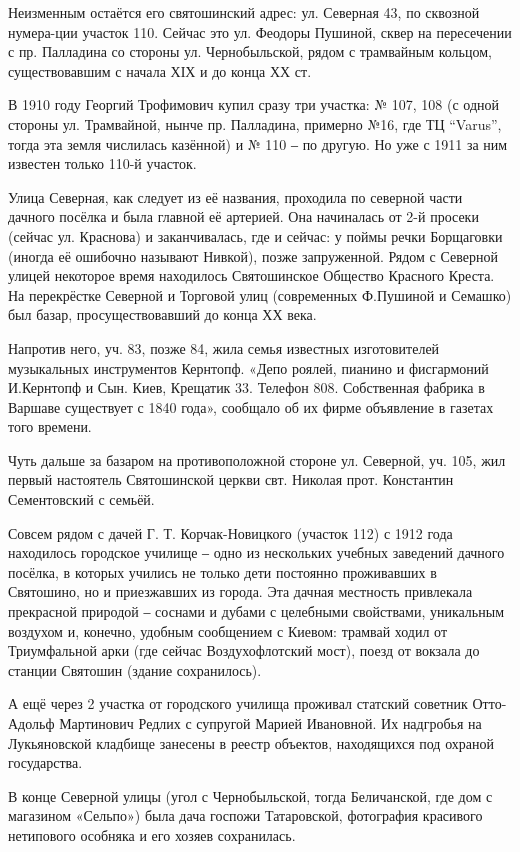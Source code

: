 Неизменным остаётся его святошинский адрес: ул. Северная  43, по сквозной
нумера-ции участок 110. Сейчас это ул. Феодоры Пушиной, сквер на пересечении с
пр. Палладина со стороны ул. Чернобыльской, рядом с трамвайным кольцом,
существовавшим с начала ХІХ и до конца ХХ ст.

В 1910 году Георгий Трофимович купил сразу три участка: № 107, 108 (с одной
стороны ул. Трамвайной, нынче пр. Палладина, примерно №16, где ТЦ “Varus”,
тогда эта земля числилась казённой) и № 110 ‒ по другую. Но уже с 1911 за ним
известен только 110-й участок.

Улица Северная, как следует из её названия, проходила по северной части дачного
посёлка и была главной её артерией. Она начиналась от 2-й просеки (сейчас ул.
Краснова) и заканчивалась, где и сейчас: у поймы речки Борщаговки (иногда её
ошибочно называют Нивкой), позже запруженной. Рядом с Северной улицей некоторое
время находилось Святошинское Общество Красного Креста. На перекрёстке Северной
и Торговой улиц (современных Ф.Пушиной и Семашко) был базар, просуществовавший
до конца ХХ века. 

Напротив него, уч. 83, позже 84, жила семья известных изготовителей музыкальных
инструментов Кернтопф. «Депо роялей, пианино и фисгармоний И.Кернтопф и Сын.
Киев, Крещатик 33. Телефон 808. Собственная фабрика в Варшаве существует с 1840
года», сообщало об их фирме объявление в газетах того времени. 

Чуть дальше за базаром на противоположной стороне ул. Северной, уч. 105, жил
первый настоятель Святошинской церкви свт. Николая прот. Константин
Сементовский с семьёй.

Совсем рядом с дачей  Г. Т. Корчак-Новицкого (участок 112) с 1912 года находилось
городское училище ‒ одно из нескольких учебных заведений дачного посёлка, в
которых учились не только дети постоянно проживавших в Святошино, но и
приезжавших из города. Эта дачная местность привлекала прекрасной природой ‒
соснами и дубами с целебными свойствами, уникальным воздухом и, конечно,
удобным сообщением с Киевом: трамвай ходил от Триумфальной арки (где сейчас
Воздухофлотский мост), поезд от вокзала до станции Святошин (здание
сохранилось).

А ещё через 2 участка от городского училища проживал статский советник
Отто-Адольф Мартинович Редлих с супругой Марией Ивановной. Их надгробья на
Лукьяновской кладбище занесены в реестр объектов, находящихся под охраной
государства. 

В конце Северной улицы (угол с Чернобыльской, тогда Беличанской, где дом с
магазином «Сельпо») была дача госпожи Татаровской, фотография красивого
нетипового особняка и его хозяев сохранилась. 

